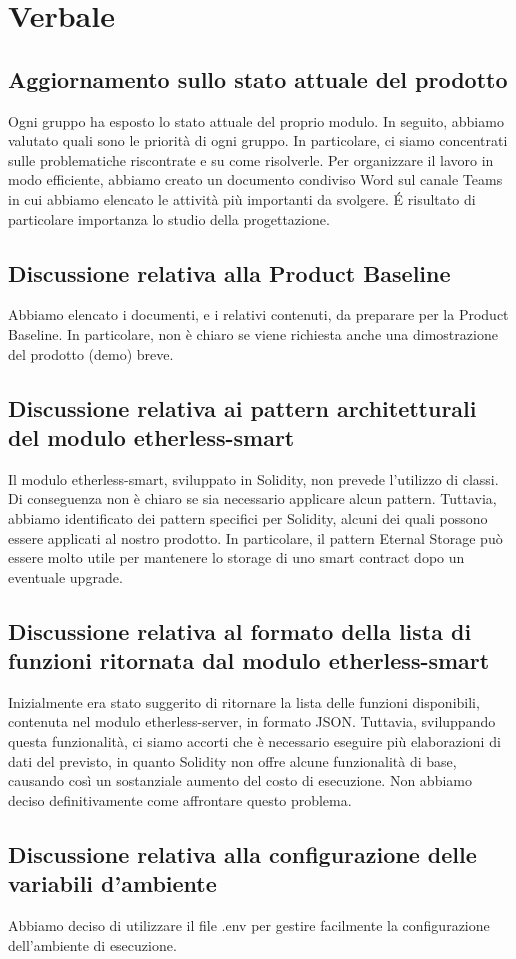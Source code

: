 \section{Verbale}
	\subsection{Aggiornamento sullo stato attuale del prodotto}
	Ogni gruppo ha esposto lo stato attuale del proprio modulo\textit{}.
	In seguito, abbiamo valutato quali sono le priorità di ogni gruppo. In particolare, ci siamo concentrati sulle problematiche riscontrate e su come risolverle. Per organizzare il lavoro in modo efficiente, abbiamo creato un documento condiviso Word sul canale Teams\textit{} in cui abbiamo elencato le attività più importanti da svolgere. \'E risultato di particolare importanza lo studio della progettazione. 
	\subsection{Discussione relativa alla Product Baseline\textit{}}
	Abbiamo elencato i documenti, e i relativi contenuti, da preparare per la Product Baseline\textit{}. In particolare, non è chiaro se viene richiesta anche una dimostrazione del prodotto (demo\textit{}) breve.
	\subsection{Discussione relativa ai pattern architetturali del modulo etherless-smart}
	Il modulo etherless-smart, sviluppato in Solidity\textit{}, non prevede l'utilizzo di classi. Di conseguenza non è chiaro se sia necessario applicare alcun pattern. Tuttavia, abbiamo identificato dei pattern specifici per Solidity\textit{}, alcuni dei quali possono essere applicati al nostro prodotto. In particolare, il pattern Eternal Storage può essere molto utile per mantenere lo storage di uno smart contract\textit{} dopo un eventuale upgrade.
	\subsection{Discussione relativa al formato della lista di funzioni ritornata dal modulo etherless-smart}
	Inizialmente era stato suggerito di ritornare la lista delle funzioni disponibili, contenuta nel modulo\textit{} etherless-server, in formato JSON\textit{}. Tuttavia, sviluppando questa funzionalità, ci siamo accorti che è necessario eseguire più elaborazioni di dati del previsto, in quanto Solidity\textit{} non offre alcune funzionalità di base, causando così un sostanziale aumento del costo di esecuzione. Non abbiamo deciso definitivamente come affrontare questo problema.
	\subsection{Discussione relativa alla configurazione delle variabili d'ambiente}
    Abbiamo deciso di utilizzare il file .env per gestire facilmente la configurazione dell'ambiente di esecuzione.